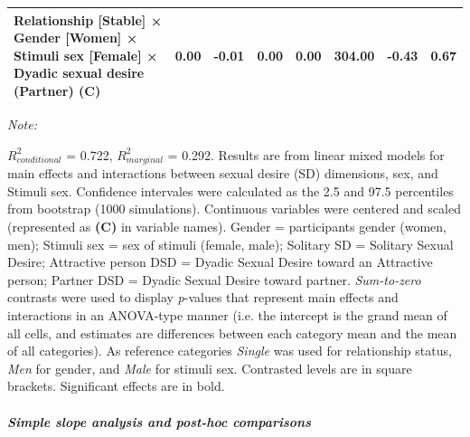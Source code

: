 \documentclass[
  bookmarksnumbered]{article}
\begin{document}
\begin{table}[H]
{\begin{threeparttable}
\begin{tabular}[t]{lccccccc}
Relationship [Stable] × Gender [Women] × Stimuli sex [Female] × Dyadic sexual desire (Partner) (C) & 0.00 & -0.01 & 0.00 & 0.00 & 304.00 & -0.43 & 0.67\\
\bottomrule
\end{tabular}
\begin{tablenotes}[para]
\item \textit{Note: } 
\item $R^2_{conditional}$ = 0.722, $R^2_{marginal}$ = 0.292. Results are from linear mixed models for main 
                              effects and interactions between sexual desire (SD) dimensions,
                              sex, and Stimuli sex.
                              Confidence intervales were calculated as the 2.5 and 97.5 
                              percentiles from bootstrap (1000 simulations).
                              Continuous variables were centered and scaled
                              (represented as \textbf{(C)} in variable names).
                              Gender = participants gender (women, men); 
                              Stimuli sex = sex of stimuli (female, male); 
                              Solitary SD = Solitary Sexual Desire;
                              Attractive person DSD = Dyadic Sexual Desire toward an 
                              Attractive person;
                              Partner DSD = Dyadic Sexual Desire toward partner.
                              \textit{Sum-to-zero} contrasts were used to display
                              \textit{p}-values that represent main effects and interactions 
                              in an ANOVA-type manner (i.e. the intercept is the grand mean of 
                              all cells, and estimates are differences between each category
                              mean and the mean of all categories).
                              As reference categories 
                              \textit{Single} was used for relationship status,
                              \textit{Men} for gender,
                              and \textit{Male} for stimuli sex. 
                              Contrasted levels are in square brackets. 
                              Significant effects are in bold.
\end{tablenotes}
\end{threeparttable}}
\end{table}

\hypertarget{simple-slope-analysis-and-post-hoc-comparisons-1}{%
\subparagraph{\texorpdfstring{Simple slope analysis and \emph{post-hoc} comparisons}{Simple slope analysis and post-hoc comparisons}}\label{simple-slope-analysis-and-post-hoc-comparisons-1}}
\end{document}
